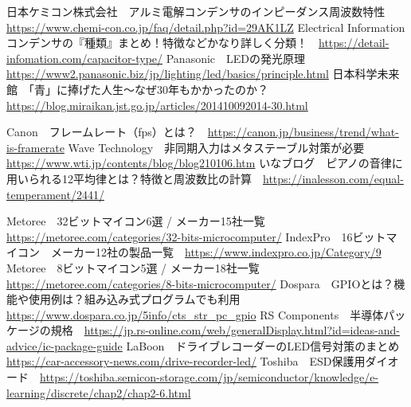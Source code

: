 
\begin{thebibliography}{99}
    \setcounter{num}{2}
    \bibitem{}日本ケミコン株式会社　アルミ電解コンデンサのインピーダンス周波数特性　\url{https://www.chemi-con.co.jp/faq/detail.php?id=29AK1LZ}
    \bibitem{}Electrical Information　コンデンサの『種類』まとめ！特徴などかなり詳しく分類！　\url{https://detail-infomation.com/capacitor-type/}
    \bibitem{}Panasonic　LEDの発光原理　\url{https://www2.panasonic.biz/jp/lighting/led/basics/principle.html}
    \bibitem{}日本科学未来館　「青」に捧げた人生～なぜ30年もかかったのか？　\url{https://blog.miraikan.jst.go.jp/articles/201410092014-30.html}

    \bibitem{}Canon　フレームレート（fps）とは？　\url{https://canon.jp/business/trend/what-is-framerate}
    \bibitem{}Wave Technology　非同期入力はメタステーブル対策が必要　\url{https://www.wti.jp/contents/blog/blog210106.htm}
    \bibitem{}いなブログ　ピアノの音律に用いられる12平均律とは？特徴と周波数比の計算　\url{https://inalesson.com/equal-temperament/2441/}

    \bibitem{}Metoree　32ビットマイコン6選 / メーカー15社一覧　\url{https://metoree.com/categories/32-bits-microcomputer/}
    \bibitem{}IndexPro　16ビットマイコン　メーカー12社の製品一覧　\url{https://www.indexpro.co.jp/Category/9}
    \bibitem{}Metoree　8ビットマイコン5選 / メーカー18社一覧　\url{https://metoree.com/categories/8-bits-microcomputer/}
    \bibitem{}Dospara　GPIOとは？機能や使用例は？組み込み式プログラムでも利用　\url{https://www.dospara.co.jp/5info/cts_str_pc_gpio}
    \bibitem{}RS Components　半導体パッケージの規格　\url{https://jp.rs-online.com/web/generalDisplay.html?id=ideas-and-advice/ic-package-guide}
    \bibitem{}LaBoon　ドライブレコーダーのLED信号対策のまとめ　\url{https://car-accessory-news.com/drive-recorder-led/}
    \bibitem{}Toshiba　ESD保護用ダイオード　\url{https://toshiba.semicon-storage.com/jp/semiconductor/knowledge/e-learning/discrete/chap2/chap2-6.html}
\end{thebibliography}